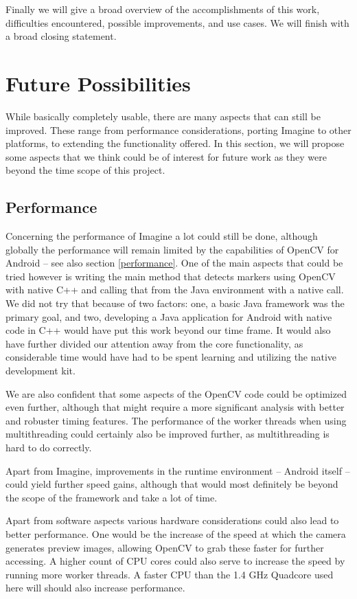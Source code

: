 Finally we will give a broad overview of the accomplishments of this work, difficulties encountered, possible improvements, and use cases.
We will finish with a broad closing statement.

\section{Future Possibilities}
\label{future}

While basically completely usable, there are many aspects that can still be improved.
These range from performance considerations, porting Imagine to other platforms, to extending the functionality offered.
In this section, we will propose some aspects that we think could be of interest for future work as they were beyond the time scope of this project.

\subsection{Performance}

Concerning the performance of Imagine a lot could still be done, although globally the performance will remain limited by the capabilities of OpenCV for Android – see also section \ref{performance}.
One of the main aspects that could be tried however is writing the main method that detects markers using OpenCV with native C++ and calling that from the Java environment with a native call.
We did not try that because of two factors: one, a basic Java framework was the primary goal, and two, developing a Java application for Android with native code in C++ would have put this work beyond our time frame.
It would also have further divided our attention away from the core functionality, as considerable time would have had to be spent learning and utilizing the native development kit.

We are also confident that some aspects of the OpenCV code could be optimized even further, although that might require a more significant analysis with better and robuster timing features.
The performance of the worker threads when using multithreading could certainly also be improved further, as multithreading is hard to do correctly.

Apart from Imagine, improvements in the runtime environment – Android itself – could yield further speed gains, although that would most definitely be beyond the scope of the framework and take a lot of time.

Apart from software aspects various hardware considerations could also lead to better performance.
One would be the increase of the speed at which the camera generates preview images, allowing OpenCV to grab these faster for further accessing.
A higher count of CPU cores could also serve to increase the speed by running more worker threads.
A faster CPU than the 1.4 GHz Quadcore used here will should also increase performance.

